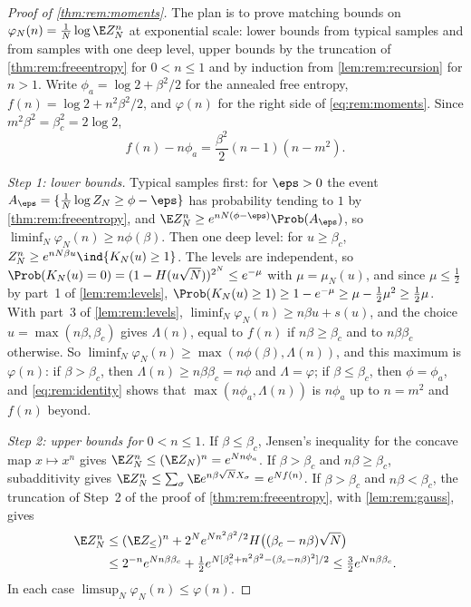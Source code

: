 \begin{refsection}
\begin{proof}[Proof of \cref{thm:rem:moments}]
The plan is to prove matching bounds on $\varphi_N(n)=\frac1N\log\E Z_N^n$ at exponential scale: lower bounds from typical samples and from samples with one deep level, upper bounds by the truncation of \cref{thm:rem:freeentropy} for $0<n\le1$ and by induction from \cref{lem:rem:recursion} for $n>1$. Write $\phi_a=\log2+\beta^2/2$ for the annealed free entropy, $f(n)=\log2+n^2\beta^2/2$, and $\varphi(n)$ for the right side of \eqref{eq:rem:moments}. Since $m^2\beta^2=\beta_c^2=2\log2$,
\begin{equation}\label{eq:rem:identity}
f(n)-n\phi_a=\frac{\beta^2}2(n-1)(n-m^2).
\end{equation}

\emph{Step 1: lower bounds.} Typical samples first: for $\eps>0$ the event $A_\eps=\{\frac1N\log Z_N\ge\phi-\eps\}$ has probability tending to $1$ by \cref{thm:rem:freeentropy}, and $\E Z_N^n\ge e^{nN(\phi-\eps)}\Prob(A_\eps)$, so $\liminf_N\varphi_N(n)\ge n\phi(\beta)$. Then one deep level: for $u\ge\beta_c$, $Z_N^n\ge e^{nN\beta u}\ind\{K_N(u)\ge1\}$. The levels are independent, so $\Prob(K_N(u)=0)=(1-H(u\sqrt N))^{2^N}\le e^{-\mu}$ with $\mu=\mu_N(u)$, and since $\mu\le\frac12$ by part~1 of \cref{lem:rem:levels}, $\Prob(K_N(u)\ge1)\ge1-e^{-\mu}\ge\mu-\frac12\mu^2\ge\frac12\mu$. With part~3 of \cref{lem:rem:levels}, $\liminf_N\varphi_N(n)\ge n\beta u+s(u)$, and the choice $u=\max(n\beta,\beta_c)$ gives $\Lambda(n)$, equal to $f(n)$ if $n\beta\ge\beta_c$ and to $n\beta\beta_c$ otherwise. So $\liminf_N\varphi_N(n)\ge\max(n\phi(\beta),\Lambda(n))$, and this maximum is $\varphi(n)$: if $\beta>\beta_c$, then $\Lambda(n)\ge n\beta\beta_c=n\phi$ and $\Lambda=\varphi$; if $\beta\le\beta_c$, then $\phi=\phi_a$, and \eqref{eq:rem:identity} shows that $\max(n\phi_a,\Lambda(n))$ is $n\phi_a$ up to $n=m^2$ and $f(n)$ beyond.

\emph{Step 2: upper bounds for $0<n\le1$.} If $\beta\le\beta_c$, Jensen's inequality for the concave map $x\mapsto x^n$ gives $\E Z_N^n\le(\E Z_N)^n=e^{Nn\phi_a}$. If $\beta>\beta_c$ and $n\beta\ge\beta_c$, subadditivity gives $\E Z_N^n\le\sum_\sigma\E e^{n\beta\sqrt NX_\sigma}=e^{Nf(n)}$. If $\beta>\beta_c$ and $n\beta<\beta_c$, the truncation of Step~2 of the proof of \cref{thm:rem:freeentropy}, with \cref{lem:rem:gauss}, gives
\begin{align*}
\E Z_N^n&\le(\E Z_\le)^n+2^Ne^{Nn^2\beta^2/2}H\bigl((\beta_c-n\beta)\sqrt N\bigr)\\
&\le2^{-n}e^{Nn\beta\beta_c}+\tfrac12e^{N[\beta_c^2+n^2\beta^2-(\beta_c-n\beta)^2]/2}\le\tfrac32e^{Nn\beta\beta_c}.
\end{align*}
In each case $\limsup_N\varphi_N(n)\le\varphi(n)$.


\end{proof}
\end{refsection}
